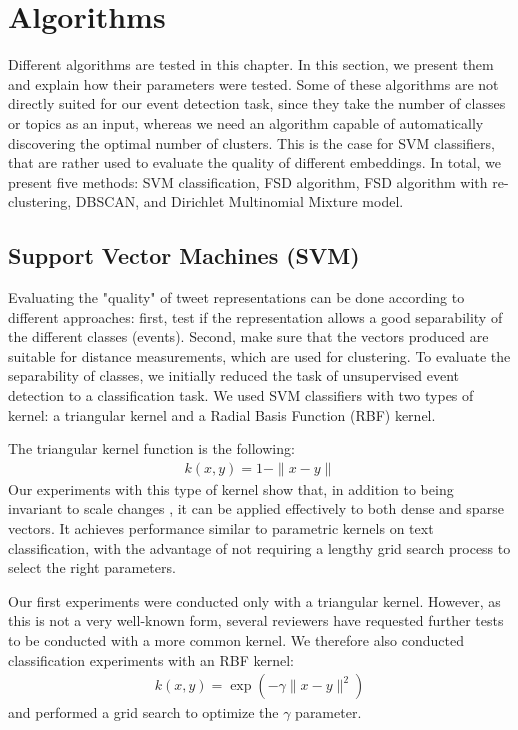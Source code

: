 \section{Algorithms}

Different algorithms are tested in this chapter. In this section, we present them and explain how their parameters were tested. Some of these algorithms are not directly suited for our event detection task,
since they take the number of classes or topics as an input, whereas we need an algorithm capable of automatically discovering the optimal number of clusters. This is the case for SVM classifiers, that are rather used to evaluate the quality of different embeddings. In total, we present five methods: SVM classification, FSD algorithm, FSD algorithm with re-clustering, DBSCAN, and Dirichlet Multinomial Mixture model.

\subsection{Support Vector Machines (SVM)}
Evaluating the "quality" of tweet representations can be done according to different approaches: first, test if the representation allows a good separability of the different classes (events). Second, make sure that the vectors produced are suitable for distance measurements, which are used for clustering. To evaluate the separability of classes, we initially reduced the task of unsupervised event detection to a classification task. We used SVM classifiers with two types of kernel: a triangular kernel \cite{fleuret2003scale} and a Radial Basis Function (RBF) kernel. 

The triangular kernel function is the following:
\begin{align}
\label{eq:triangular kernel}
k(x, y) = 1 - \|x - y\|
\end{align}
Our experiments with this type of kernel show that, in addition to being invariant to scale changes \citep{fleuret2003scale}, it can be applied effectively to both dense and sparse vectors. It achieves performance similar to parametric kernels on text classification, with the advantage of not requiring a lengthy grid search process to select the right parameters.

Our first experiments were conducted only with a triangular kernel. However, as this is not a very well-known form, several reviewers have requested further tests to be conducted with a more common kernel. We therefore also conducted classification experiments with an RBF kernel:
\begin{align}
\label{eq:RBF kernel}
k(x, y) = \exp(-\gamma \|x - y \|^{2})
\end{align}
and performed a grid search to optimize the $\gamma$ parameter.

